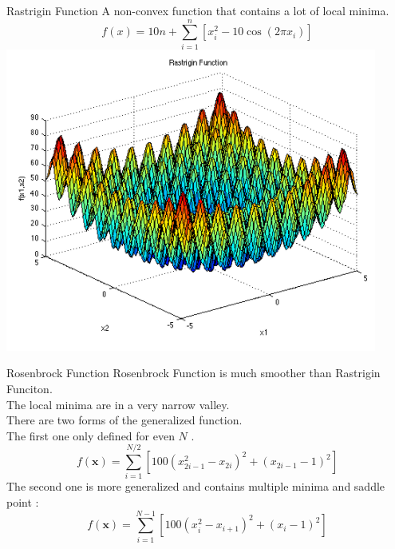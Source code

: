     \begin{frame}{Rastrigin Function}
        A non-convex function that contains a lot of local minima. \cite{rastrigin1974systems,Rudolph1990diploma}
        \begin{equation*}
            f(x) = 10n + \sum^n_{i=1}[ x^2_i - 10 \cos{(2\pi x_i)}]
        \end{equation*}
        \centering
        \includegraphics[height = 0.6\textheight]{images/Rastrigin2.png}
    \end{frame}
    
    \begin{frame}{Rosenbrock Function}
    Rosenbrock Function \cite{Rosenbrock} is much smoother than Rastrigin Funciton. \\
    The local minima are in a very narrow valley. \\
    There are two forms of the generalized function. \\
    The first one only defined for even $N$ \cite{Dixon1994-wm}.
    \begin{equation*}
        f(\mathbf{x}) = \sum^{N/2}_{i=1} [100(x^2_{2i - 1} - x_{2i})^2 + (x_{2i-1} - 1)^2]
    \end{equation*}
    The second one is more generalized and contains multiple minima and saddle point \cite{10.5555/534133}:
    \begin{equation*}
        f(\mathbf{x}) = \sum^{N-1}_{i=1} [100(x^2_i - x_ {i+1})^2 + (x_i - 1)^2]
    \end{equation*}

    \end{frame}

